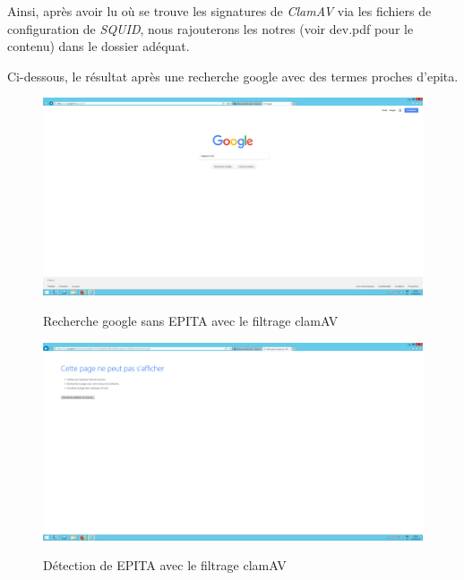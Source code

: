 Ainsi, après avoir lu où se trouve les signatures de \textit{ClamAV} via les fichiers de configuration de \textit{SQUID}, nous rajouterons les notres (voir dev.pdf pour le contenu) dans le dossier adéquat.

Ci-dessous, le résultat après une recherche google avec des termes proches d'epita.
\begin{figure}[h!]
    \begin{center}
        \includegraphics[scale=0.20]{Interception_Screenshots/clamAV01.png}
        \label{Pfsense_Screeshots/interception/18}
        \caption{Recherche google sans EPITA avec le filtrage clamAV}
    \end{center}
\end{figure}
\FloatBarrier

\begin{figure}[h!]
    \begin{center}
        \includegraphics[scale=0.20]{Interception_Screenshots/clamAV02.png}
        \label{Pfsense_Screeshots/interception/18}
        \caption{Détection de EPITA avec le filtrage clamAV}
    \end{center}
\end{figure}
\FloatBarrier

